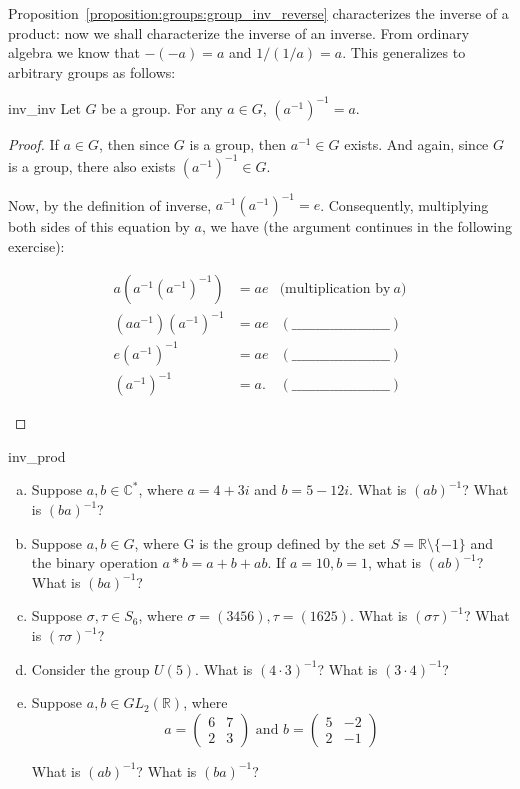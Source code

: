 Proposition~\ref{proposition:groups:group_inv_reverse} characterizes the inverse of a product: now we shall characterize the inverse of an inverse. From ordinary algebra we know that $-(-a) = a$ and $1/(1/a) = a$. This generalizes to arbitrary groups as follows:

\begin{prop}{inv_inv}
Let $G$ be a group.  For any $a \in G$, $(a^{-1})^{-1} = a$.
\end{prop}
 
\begin{proof}
If $a \in G$, then since $G$ is a group, then $a^{-1} \in G$ exists.  And again, since $G$ is a group, there also exists $(a^{-1})^{-1} \in G$.

Now, by the definition of inverse, $a^{-1} (a^{-1})^{-1} = e$. Consequently, multiplying both sides of this equation by $a$, we have  (the argument continues in the following exercise):

\begin{exercise}{44}
\begin{align*}
a(a^{-1}(a^{-1})^{-1}) & = ae &\mbox{(multiplication by}~a)\\
(aa^{-1})(a^{-1})^{-1} & = ae   &(\_\_\_\_\_\_\_\_\_\_\_\_\_\_\_\_\_\_\_\_\_) \\
e(a^{-1})^{-1} & = ae   &(\_\_\_\_\_\_\_\_\_\_\_\_\_\_\_\_\_\_\_\_\_) \\
(a^{-1})^{-1} &= a.  &(\_\_\_\_\_\_\_\_\_\_\_\_\_\_\_\_\_\_\_\_\_)
\end{align*}
\end{exercise}
\end{proof}

\begin{exercise}{inv_prod}
\begin{enumerate}[(a)]
\item
Suppose $a,b \in {\mathbb C}^{\ast}$, where $a = 4 + 3i$ and $b = 5 - 12i$.  What is $(ab)^{-1}$?  What is $(ba)^{-1}$?
\item
Suppose $a,b \in G$, where G is the group defined by the set $S = {\mathbb R} \setminus \{ -1 \}$ and the binary operation $a \ast b = a + b +ab$.  If $a = 10, b = 1$, what is $(ab)^{-1}$?  What is $(ba)^{-1}$?
\item
Suppose $\sigma, \tau \in S_6$, where $\sigma = (3456), \tau = (1625)$.  What is $(\sigma \tau)^{-1}$?  What is $(\tau \sigma)^{-1}$?
\item
Consider the group $U(5)$.  What is $(4 \cdot 3)^{-1}$?  What is $(3 \cdot 4)^{-1}$?
\item
Suppose $a, b \in GL_2({\mathbb R})$, where
\[
a = \begin{pmatrix}
6 & 7 \\
2 & 3
\end{pmatrix} \mbox{ and }
b = \begin{pmatrix}
5 & -2 \\
2 & -1
\end{pmatrix} \]

What is $(ab)^{-1}$?  What is $(ba)^{-1}$?
\end{enumerate}
\end{exercise}{}

